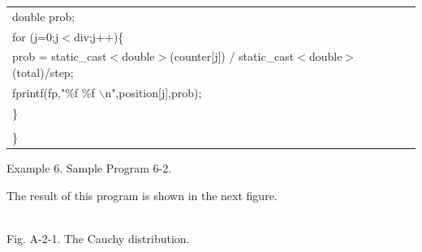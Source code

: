 {\begin{center}
\begin{tabular}{|l|}
\hspace*{10mm}double prob;\\
\hspace*{10mm}for (j=0;j$<$div;j++)\{\\
\hspace*{20mm}prob = static\_cast$<$double$>$(counter[j]) / static\_cast$<$double$>$(total)/step;\\
\hspace*{20mm}fprintf(fp,"\%f \%f $\backslash$n",position[j],prob);\\
\hspace*{10mm}\}\\
\hspace*{\textwidth}\\
\}\\\hline
\end{tabular}
\vspace*{5mm}

{\small
Example 6. Sample Program 6-2.
}
\end{center}
}

\vspace*{10mm}

\noindent
The result of this program is shown in the next figure.

\clearpage

\begin{center}
\\
\vspace*{10mm}
Fig. A-2-1. The Cauchy distribution.\\
\end{center}

